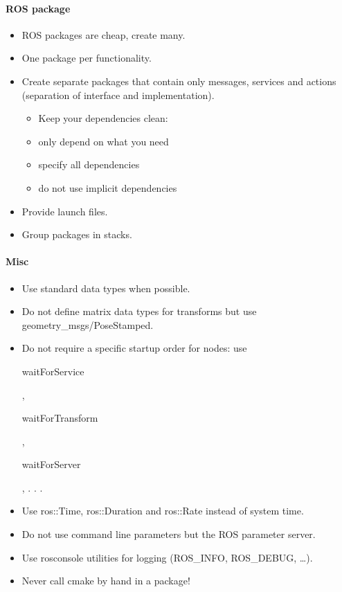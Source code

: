 \paragraph{ROS package}
\begin{itemize}
\item ROS packages are cheap, create many.
\item One package per functionality.
\item Create separate packages that contain only messages, services and
actions (separation of interface and implementation).
\begin{itemize}
\item Keep your dependencies clean:
\item only depend on what you need
\item specify all dependencies 
\item do not use implicit dependencies
\end{itemize}
\item Provide launch files.
\item Group packages in stacks.
\end{itemize}


\paragraph{Misc}
\begin{itemize}
\item Use standard data types when possible.
\item Do not define matrix data types for transforms but use geometry\_msgs/PoseStamped.
\item Do not require a specific startup order for nodes: use \begin{tt}waitForService\end{tt}, \begin{tt}waitForTransform\end{tt}, \begin{tt}waitForServer\end{tt}, . . .
\item Use ros::Time, ros::Duration and ros::Rate instead of system time.
\item Do not use command line parameters but the ROS parameter server.
\item Use rosconsole utilities for logging (ROS\_INFO, ROS\_DEBUG, \ldots).
\item Never call cmake by hand in a package!
\end{itemize}


